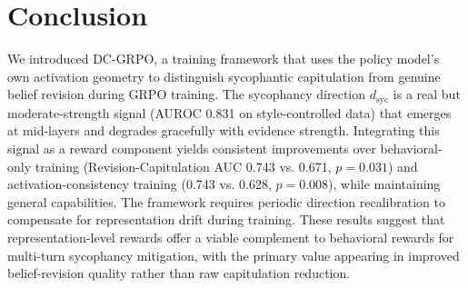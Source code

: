 \documentclass[11pt,a4paper]{article}
\newcommand{\dsyc}{$d_{\mathrm{syc}}$}
\begin{document}
\section{Conclusion}

We introduced DC-GRPO, a training framework that uses the policy model's own activation geometry to distinguish sycophantic capitulation from genuine belief revision during GRPO training. The sycophancy direction \dsyc{} is a real but moderate-strength signal (AUROC 0.831 on style-controlled data) that emerges at mid-layers and degrades gracefully with evidence strength. Integrating this signal as a reward component yields consistent improvements over behavioral-only training (Revision-Capitulation AUC 0.743 vs. 0.671, $p = 0.031$) and activation-consistency training (0.743 vs. 0.628, $p = 0.008$), while maintaining general capabilities. The framework requires periodic direction recalibration to compensate for representation drift during training. These results suggest that representation-level rewards offer a viable complement to behavioral rewards for multi-turn sycophancy mitigation, with the primary value appearing in improved belief-revision quality rather than raw capitulation reduction.
\end{document}
